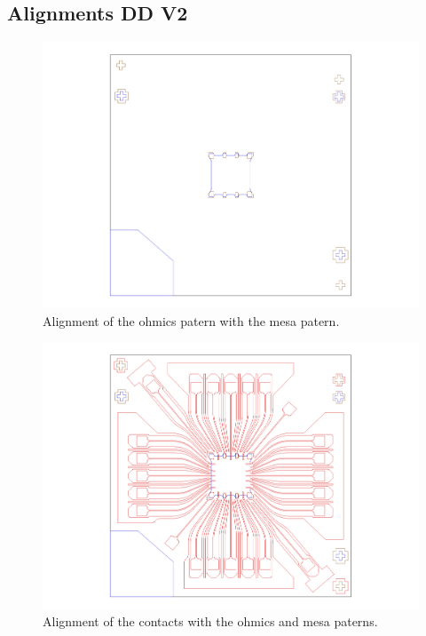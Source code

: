 \documentclass[12pt,a4paper]{report}
\begin{document}
\subsection{Alignments DD V2}

\begin{figure} [h] \centering
\includegraphics[scale=0.3]{fig/align1_1.pdf}
\caption{Alignment of the ohmics patern with the mesa patern.} \label{align1}
\end{figure}

\begin{figure} [h] \centering
\includegraphics[scale=0.3]{fig/align2_1.pdf}
\caption{Alignment of the contacts with the ohmics and mesa paterns.} \label{align2}
\end{figure}
\end{document}
